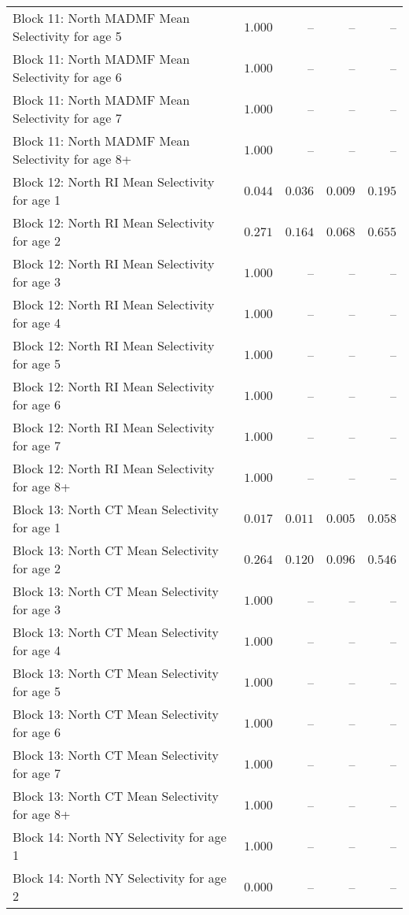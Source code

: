 \documentclass[
]{article}
\begin{document}
\begin{landscape}
\begin{longtable}[t]{lrrrr}
Block 11: North MADMF Mean Selectivity for age 5 & $1.000$ & -- & -- & --\\
Block 11: North MADMF Mean Selectivity for age 6 & $1.000$ & -- & -- & --\\
Block 11: North MADMF Mean Selectivity for age 7 & $1.000$ & -- & -- & --\\
\addlinespace
Block 11: North MADMF Mean Selectivity for age 8+ & $1.000$ & -- & -- & --\\
Block 12: North RI Mean Selectivity for age 1 & $0.044$ & $0.036$ & $0.009$ & $0.195$\\
Block 12: North RI Mean Selectivity for age 2 & $0.271$ & $0.164$ & $0.068$ & $0.655$\\
Block 12: North RI Mean Selectivity for age 3 & $1.000$ & -- & -- & --\\
Block 12: North RI Mean Selectivity for age 4 & $1.000$ & -- & -- & --\\
\addlinespace
Block 12: North RI Mean Selectivity for age 5 & $1.000$ & -- & -- & --\\
Block 12: North RI Mean Selectivity for age 6 & $1.000$ & -- & -- & --\\
Block 12: North RI Mean Selectivity for age 7 & $1.000$ & -- & -- & --\\
Block 12: North RI Mean Selectivity for age 8+ & $1.000$ & -- & -- & --\\
Block 13: North CT Mean Selectivity for age 1 & $0.017$ & $0.011$ & $0.005$ & $0.058$\\
\addlinespace
Block 13: North CT Mean Selectivity for age 2 & $0.264$ & $0.120$ & $0.096$ & $0.546$\\
Block 13: North CT Mean Selectivity for age 3 & $1.000$ & -- & -- & --\\
Block 13: North CT Mean Selectivity for age 4 & $1.000$ & -- & -- & --\\
Block 13: North CT Mean Selectivity for age 5 & $1.000$ & -- & -- & --\\
Block 13: North CT Mean Selectivity for age 6 & $1.000$ & -- & -- & --\\
\addlinespace
Block 13: North CT Mean Selectivity for age 7 & $1.000$ & -- & -- & --\\
Block 13: North CT Mean Selectivity for age 8+ & $1.000$ & -- & -- & --\\
Block 14: North NY Selectivity for age 1 & $1.000$ & -- & -- & --\\
Block 14: North NY Selectivity for age 2 & $0.000$ & -- & -- & --\\

\end{longtable}
\end{landscape}
\end{document}
